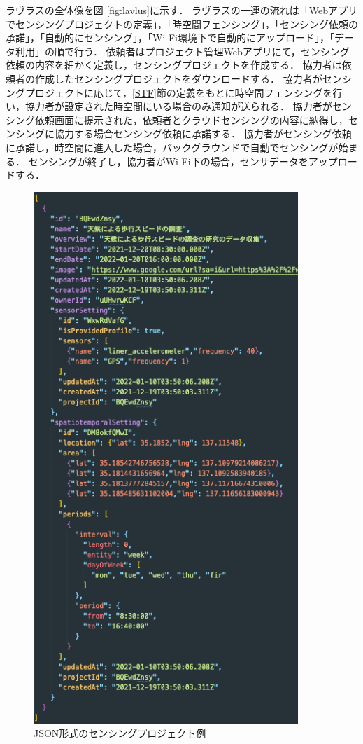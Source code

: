ラヴラスの全体像を図 \ref{fig:lavlus}に示す．
ラヴラスの一連の流れは「Webアプリでセンシングプロジェクトの定義」，「時空間フェンシング」，「センシング依頼の承諾」，「自動的にセンシング」，「Wi-Fi環境下で自動的にアップロード」，「データ利用」の順で行う．
依頼者はプロジェクト管理Webアプリにて，センシング依頼の内容を細かく定義し，センシングプロジェクトを作成する．
協力者は依頼者の作成したセンシングプロジェクトをダウンロードする．
協力者がセンシングプロジェクトに応じて，\ref{STF}節の定義をもとに時空間フェンシングを行い，協力者が設定された時空間にいる場合のみ通知が送られる．
協力者がセンシング依頼画面に提示された，依頼者とクラウドセンシングの内容に納得し，センシングに協力する場合センシング依頼に承諾する．
協力者がセンシング依頼に承諾し，時空間に進入した場合，バックグラウンドで自動でセンシングが始まる．
センシングが終了し，協力者がWi-Fi下の場合，センサデータをアップロードする．

\begin{figure}[tbh]
    \centering
    \includegraphics[width=10cm]{img_JSON.png}
    \caption{JSON形式のセンシングプロジェクト例}
    \label{fig:JSON}
\end{figure}

